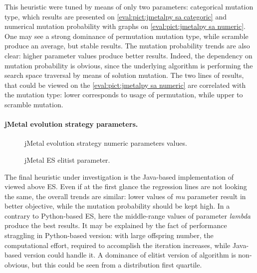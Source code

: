 This heuristic were tuned by means of only two parameters: categorical mutation type, which results are presented on \cref{eval:pict:jmetalpy sa categoric} and numerical mutation probability with graphs on \cref{eval:pict:jmetalpy sa numeric}. One may see a strong dominance of permutation mutation type, while scramble produce an average, but stable results. The mutation probability trends are also clear: higher parameter values produce better results. Indeed, the dependency on mutation probability is obvious, since the underlying algorithm is performing the search space traversal by means of solution mutation. The two lines of results, that could be viewed on the \cref{eval:pict:jmetalpy sa numeric} are correlated with the mutation type: lower corresponds to usage of permutation, while upper to scramble mutation.


\paragraph{jMetal evolution strategy parameters.}
\begin{figure}[h]
	\centering
	\vspace{-10pt}
	
	\caption{jMetal evolution strategy numeric parameters values.}
	\vspace{-15pt}
	\label{eval:pict:jmetal es numeric}
\end{figure}

\begin{wrapfigure}{R}{0.5\textwidth}
	\centering
	\vspace{-20pt}
	
	\label{eval:pict:jmetal es categoric}
	\caption{jMetal ES elitist parameter.}
	\vspace{-30pt}
\end{wrapfigure}

The final heuristic under investigation is the Java-based implementation of viewed above ES. Even if at the first glance the regression lines are not looking the same, the overall trends are similar: lower values of \emph{mu} parameter result in better objective, while the mutation probability should be kept high. In a contrary to Python-based ES, here the middle-range values of parameter \emph{lambda} produce the best results. It may be explained by the fact of performance straggling in Python-based version: with large offspring number, the computational effort, required to accomplish the iteration increases, while Java-based version could handle it. A dominance of elitist version of algorithm is non-obvious, but this could be seen from a distribution first quartile.

